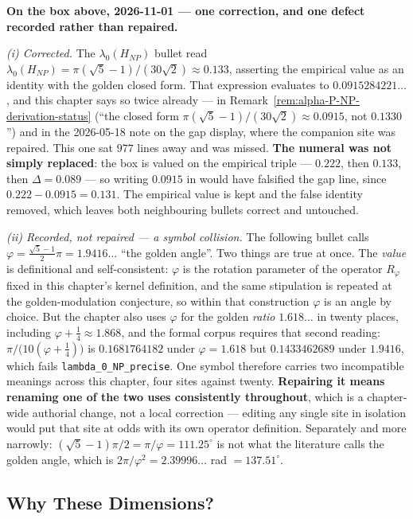 \noindent\textbf{On the box above, 2026-11-01 --- one correction, and one defect
recorded rather than repaired.}

\emph{(i) Corrected.} The $\lambda_0(H_{NP})$ bullet read
$\lambda_0(H_{NP}) = \pi(\sqrt{5}-1)/(30\sqrt{2}) \approx 0.133$, asserting the
empirical value as an identity with the golden closed form. That expression
evaluates to $0.0915284221\ldots$, and this chapter says so twice already --- in
Remark~\ref{rem:alpha-P-NP-derivation-status} (``the closed form
$\pi(\sqrt{5}-1)/(30\sqrt{2}) \approx 0.0915$, not $0.1330$'') and in the
2026-05-18 note on the gap display, where the companion site was repaired. This
one sat $977$ lines away and was missed. \textbf{The numeral was not simply
replaced}: the box is valued on the empirical triple --- $0.222$, then $0.133$,
then $\Delta = 0.089$ --- so writing $0.0915$ in would have falsified the gap
line, since $0.222 - 0.0915 = 0.131$. The empirical value is kept and the false
identity removed, which leaves both neighbouring bullets correct and untouched.

\emph{(ii) Recorded, not repaired --- a symbol collision.} The following bullet
calls $\varphi = \frac{\sqrt{5}-1}{2}\pi = 1.9416\ldots$ ``the golden angle''.
Two things are true at once. The \emph{value} is definitional and
self-consistent: $\varphi$ is the rotation parameter of the operator $R_\varphi$
fixed in this chapter's kernel definition, and the same stipulation is repeated
at the golden-modulation conjecture, so within that construction $\varphi$ is an
angle by choice. But the chapter also uses $\varphi$ for the golden \emph{ratio}
$1.618\ldots$ in twenty places, including $\varphi + \tfrac14 \approx 1.868$, and
the formal corpus requires that second reading:
$\pi/\bigl(10(\varphi+\tfrac14)\bigr)$ is $0.1681764182$ under
$\varphi = 1.618$ but $0.1433462689$ under $1.9416$, which fails
\texttt{lambda\_0\_NP\_precise}. One symbol therefore carries two incompatible
meanings across this chapter, four sites against twenty. \textbf{Repairing it
means renaming one of the two uses consistently throughout}, which is a
chapter-wide authorial change, not a local correction --- editing any single site
in isolation would put that site at odds with its own operator definition.
Separately and more narrowly: $(\sqrt{5}-1)\pi/2 = \pi/\varphi = 111.25^\circ$ is
not what the literature calls the golden angle, which is
$2\pi/\varphi^{2} = 2.39996\ldots$ rad $= 137.51^\circ$.

\subsection{Why These Dimensions?}


